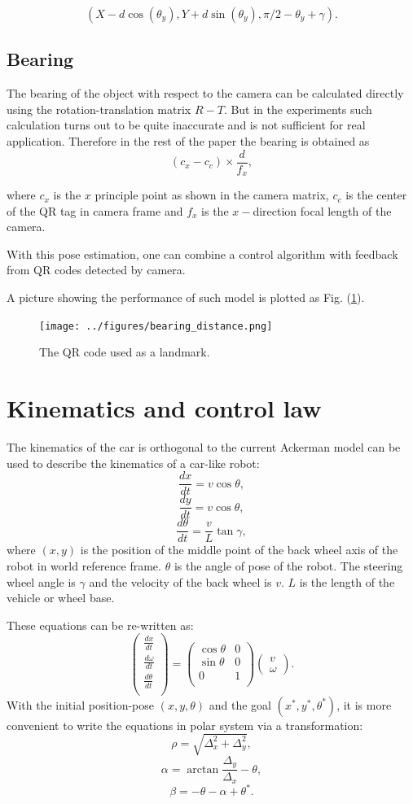 \documentclass[12pt]{article}
\begin{document}
$$(X-d\cos(\theta_y),Y+d\sin(\theta_y),\pi/2-\theta_y+\gamma).$$
\subsection{Bearing}
The bearing of the object with respect to the camera can be calculated directly using the rotation-translation matrix $R-T$. But in the experiments such calculation turns out to be quite inaccurate and is not sufficient for real application. Therefore in the rest of the paper the bearing is obtained as $$(c_x-c_c)\times \frac{d}{f_x},$$

where $c_x$ is the $x$ principle point as shown in the camera matrix, $c_c$ is the center of the QR tag in camera frame and $f_x$ is the $x-$direction focal length of the camera.

With this pose estimation, one can combine a control algorithm with feedback from QR codes detected by camera.

A picture showing the performance of such model is plotted as  Fig. (\ref{QR}).

\begin{figure}[htbp]
\centering
\texttt{[image: ../figures/bearing\_distance.png]}
\caption{The QR code used as a landmark.}\label{QR}
\end{figure}

\section{Kinematics and control law}
\label{kine}
The kinematics of the car is orthogonal to the current 
Ackerman model can be used to describe the kinematics of a car-like robot: 
$$\frac{d x}{dt}=v\cos \theta,$$
$$\frac{d y}{dt}=v\cos \theta,$$
$$\frac{d \theta}{dt}=\frac{v}{L}\tan \gamma,$$
where $(x,y)$ is the position of the middle point of the back wheel axis of the robot in world reference frame. $\theta$ is the angle of pose of the robot. The steering wheel angle is $\gamma$ and the velocity of the back wheel is $v$. $L$ is the length of the vehicle or wheel base.

These equations can be re-written as:
$$
\begin{pmatrix}
\frac{d x}{dt} \\
\frac{d \omega}{dt} \\
\frac{d \theta}{dt} \\
\end{pmatrix}
=
\begin{pmatrix}
\cos \theta & 0 \\
\sin \theta & 0 \\
0 & 1\\
\end{pmatrix}
\begin{pmatrix}
v \\
\omega
\end{pmatrix}.
$$
With the initial position-pose $(x,y,\theta)$ and the goal $(x^*,y^*,\theta^*)$, it is more convenient to write the equations in polar system via a transformation:
$$\rho=\sqrt{\Delta_x^2+\Delta_y^2},$$
$$\alpha=\arctan \frac{\Delta_y}{\Delta_x}-\theta,$$
$$\beta=-\theta-\alpha+\theta^*.$$
\end{document}
